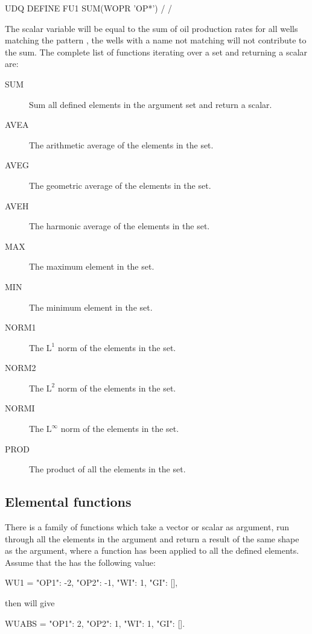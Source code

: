 \begin{deck}
UDQ
  DEFINE FU1 SUM(WOPR 'OP*') /
/
\end{deck}
The scalar variable  will be equal to the sum of oil production rates
for all wells matching the pattern , the wells with a name not matching
 will not contribute to the sum. The complete list of functions iterating
over a set and returning a scalar are:

\begin{description}
\item[SUM] Sum all defined elements in the argument set and return a scalar.
\item[AVEA] The arithmetic average of the elements in the set.
\item[AVEG] The geometric average of the elements in the set.
\item[AVEH] The harmonic average of the elements in the set.
\item[MAX] The maximum element in the set.
\item[MIN] The minimum element in the set.
\item[NORM1] The $\mathrm{L^1}$ norm of the elements in the set.
\item[NORM2] The $\mathrm{L^2}$ norm of the elements in the set.
\item[NORMI] The $\mathrm{L^\infty}$ norm of the elements in the set.
\item[PROD] The product of all the elements in the set.
\end{description}


\subsection{Elemental functions}
There is a family of functions which take a vector or scalar as argument, run
through  all the elements in the argument and return a result of the same shape
as the argument, where a function has been applied to all the defined elements.
Assume that the  has the following value:

\begin{code}
  WU1 = {"OP1": -2, "OP2": -1, "WI": 1, "GI": []},
\end{code}

then  will give

\begin{code}
  WUABS = {"OP1": 2, "OP2": 1, "WI": 1, "GI": []}.
\end{code}

